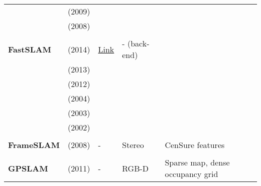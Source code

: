 \documentclass[a4paper,12pt]{scrartcl}
\begin{document}
{\begin{longtable}{l|l|l|l|l}
                           & \cite{Cummins2009} (2009)         &                                                                    &                       &\\
                           & \cite{Cummins2008} (2008)         &                                                                    &                       &\\
                           &                                   &                                                                    &                       &\\
    \textbf{FastSLAM}      & \cite{Abouzahir2014} (2014)       & {\href{https://github.com/bushuhui/fastslam}{Link}}                & - (back-end)          &\\
                           & \cite{Naminski2013} (2013)        &                                                                    &                       &\\
                           & \cite{Kurt-Yavuz2012} (2012)      &                                                                    &                       &\\
                           & \cite{Thrun2004} (2004)           &                                                                    &                       &\\
                           & \cite{Montemerlo2003} (2003)      &                                                                    &                       &\\
                           & \cite{Montemerlo2002} (2002)      &                                                                    &                       &\\
                           &                                   &                                                                    &                       &\\
    \textbf{FrameSLAM}     & \cite{Konolige2008} (2008)        & -                                                                  & Stereo                & CenSure features\\
                           &                                   &                                                                    &                       &\\
    \textbf{GPSLAM}        & \cite{Pirker2011a} (2011)         & -                                                                  & RGB-D                 & Sparse map, dense occupancy grid\\

\end{longtable}}
\end{document}
